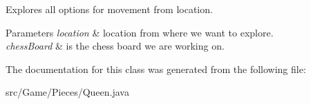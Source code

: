 Explores all options for movement from location. 
\begin{DoxyParams}{Parameters}
{\em location} & location from where we want to explore. \\
\hline
{\em chess\+Board} & is the chess board we are working on. \\
\hline
\end{DoxyParams}


The documentation for this class was generated from the following file\+:\begin{DoxyCompactItemize}
\item 
src/\+Game/\+Pieces/Queen.\+java\end{DoxyCompactItemize}
